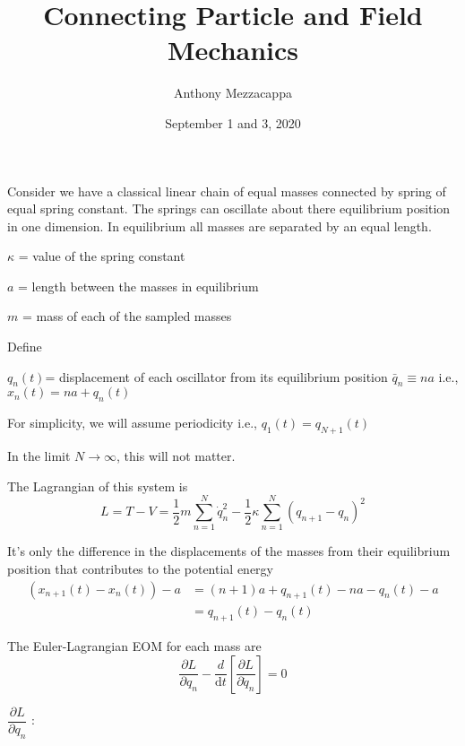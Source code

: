 \documentclass{article}
\title{Connecting Particle and Field Mechanics}
\author{Anthony Mezzacappa}
\date{September 1 and 3, 2020}
\begin{document}
\setlength{\parskip}{1em}

\maketitle

\noindent Consider we have a classical linear chain of equal masses connected by spring of equal spring constant. The springs can oscillate about there equilibrium position in one dimension. In equilibrium all masses are separated by an equal length. \par

$\kappa$ = value of the spring constant \par
$a$ = length between the masses in equilibrium\par
$m$ = mass of each of the sampled masses\par


\noindent Define \par
\noindent $q_n(t) $= displacement of each oscillator from its equilibrium position $\bar{q}_n \equiv na $ i.e., $x_n(t) = na+q_n(t)$ \par
\noindent For simplicity, we will assume periodicity i.e., $q_1(t) =q_{N+1}(t)$ \par
\noindent In the limit $N \rightarrow \infty$, this will not matter. \par


\noindent The Lagrangian of this system is
\begin{equation}
    L = T - V  = \frac{1}{2} m \sum_{n=1}^N \dot{q}_n^2 - \frac{1}{2} \kappa \sum_{n=1}^N (q_{n+1} - q_n)^2
\end{equation}

\noindent It's only the difference in the displacements of the masses from their equilibrium position that contributes to the potential energy
\begin{align*}
    \left( x_{n+1} (t) - x_n (t) \right) - a &= ( n + 1 ) a + q_{n+1} (t) - n a - q_n (t) - a \\
    &= q_{n+1} (t) - q_n (t)
\end{align*}

\noindent The Euler-Lagrangian EOM for each mass are
\begin{equation}
    \dfrac{ \partial L }{ \partial q_n} -  \dfrac{d}{ \mathrm{d} t} \left[\dfrac{ \partial L }{ \partial \dot {q}_n } \right] = 0
\end{equation}

$\dfrac{ \partial L }{ \partial q_n}$ :
\end{document}
